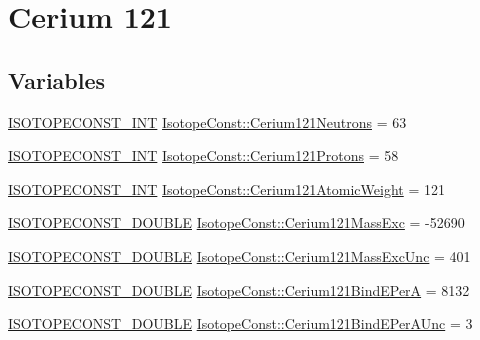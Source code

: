 \hypertarget{group___isotope_const-_cerium-_ce121}{}\section{Cerium 121}
\label{group___isotope_const-_cerium-_ce121}
\subsection*{Variables}
\begin{DoxyCompactItemize}
\item 
\mbox{\hyperlink{group___isotope_const-_macros_ga5f18360b3e99483a35c32d789e62621c}{I\+S\+O\+T\+O\+P\+E\+C\+O\+N\+S\+T\+\_\+\+I\+NT}} \mbox{\hyperlink{group___isotope_const-_cerium-_ce121_ga621adab1f2c75575ff18455227bb227a}{Isotope\+Const\+::\+Cerium121\+Neutrons}} = 63
\item 
\mbox{\hyperlink{group___isotope_const-_macros_ga5f18360b3e99483a35c32d789e62621c}{I\+S\+O\+T\+O\+P\+E\+C\+O\+N\+S\+T\+\_\+\+I\+NT}} \mbox{\hyperlink{group___isotope_const-_cerium-_ce121_gae9ca5a70e062b884018d79596db58c7a}{Isotope\+Const\+::\+Cerium121\+Protons}} = 58
\item 
\mbox{\hyperlink{group___isotope_const-_macros_ga5f18360b3e99483a35c32d789e62621c}{I\+S\+O\+T\+O\+P\+E\+C\+O\+N\+S\+T\+\_\+\+I\+NT}} \mbox{\hyperlink{group___isotope_const-_cerium-_ce121_ga97d51ca691dbd4b71b32864537abbd2c}{Isotope\+Const\+::\+Cerium121\+Atomic\+Weight}} = 121
\item 
\mbox{\hyperlink{group___isotope_const-_macros_ga8f45a7272ce02c0b4c65c44636ed719a}{I\+S\+O\+T\+O\+P\+E\+C\+O\+N\+S\+T\+\_\+\+D\+O\+U\+B\+LE}} \mbox{\hyperlink{group___isotope_const-_cerium-_ce121_gaa4169beac6835eb89f8f5942a7f62937}{Isotope\+Const\+::\+Cerium121\+Mass\+Exc}} = -\/52690
\item 
\mbox{\hyperlink{group___isotope_const-_macros_ga8f45a7272ce02c0b4c65c44636ed719a}{I\+S\+O\+T\+O\+P\+E\+C\+O\+N\+S\+T\+\_\+\+D\+O\+U\+B\+LE}} \mbox{\hyperlink{group___isotope_const-_cerium-_ce121_ga0fac78b2ec06c528adcca304455ecf53}{Isotope\+Const\+::\+Cerium121\+Mass\+Exc\+Unc}} = 401
\item 
\mbox{\hyperlink{group___isotope_const-_macros_ga8f45a7272ce02c0b4c65c44636ed719a}{I\+S\+O\+T\+O\+P\+E\+C\+O\+N\+S\+T\+\_\+\+D\+O\+U\+B\+LE}} \mbox{\hyperlink{group___isotope_const-_cerium-_ce121_ga8afcbc0a6e7eb03eb4806e23d79fcba0}{Isotope\+Const\+::\+Cerium121\+Bind\+E\+PerA}} = 8132
\item 
\mbox{\hyperlink{group___isotope_const-_macros_ga8f45a7272ce02c0b4c65c44636ed719a}{I\+S\+O\+T\+O\+P\+E\+C\+O\+N\+S\+T\+\_\+\+D\+O\+U\+B\+LE}} \mbox{\hyperlink{group___isotope_const-_cerium-_ce121_ga427b4579159a80aa5567e05121974cb8}{Isotope\+Const\+::\+Cerium121\+Bind\+E\+Per\+A\+Unc}} = 3

\end{DoxyCompactItemize}
